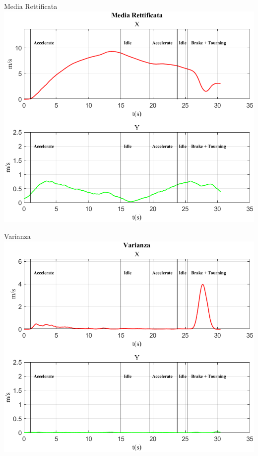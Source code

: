 \documentclass[beamer]{standalone}
\begin{document}
	\begin{frame}{{Media Rettificata}}
		\centering\includegraphics[height=.8\textheight]{figure/Vel/Media Rettificata}
	\end{frame}
	
	\begin{frame}{{Varianza}}
		\centering\includegraphics[height=.8\textheight]{figure/Vel/Varianza}
	\end{frame}
	
\end{document}
